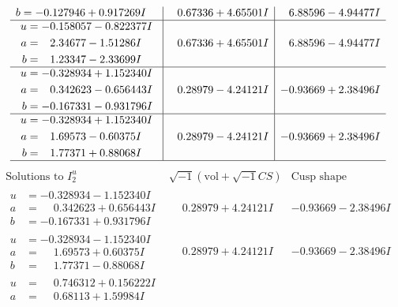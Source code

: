 \documentclass[1p]{elsarticle_modified}
\theoremstyle{definition}
\newcommand{\I}{\sqrt{-1}}
\begin{document}
$$\begin{array}{c|c|c}
\begin{aligned}
b &= -0.127946 + 0.917269 I\end{aligned}
 & \phantom{-}0.67336 + 4.65501 I & \phantom{-}6.88596 - 4.94477 I \\ \hline\begin{aligned}
u &= -0.158057 - 0.822377 I \\
a &= \phantom{-}2.34677 - 1.51286 I \\
b &= \phantom{-}1.23347 - 2.33699 I\end{aligned}
 & \phantom{-}0.67336 + 4.65501 I & \phantom{-}6.88596 - 4.94477 I \\ \hline\begin{aligned}
u &= -0.328934 + 1.152340 I \\
a &= \phantom{-}0.342623 - 0.656443 I \\
b &= -0.167331 - 0.931796 I\end{aligned}
 & \phantom{-}0.28979 - 4.24121 I & -0.93669 + 2.38496 I \\ \hline\begin{aligned}
u &= -0.328934 + 1.152340 I \\
a &= \phantom{-}1.69573 - 0.60375 I \\
b &= \phantom{-}1.77371 + 0.88068 I\end{aligned}
 & \phantom{-}0.28979 - 4.24121 I & -0.93669 + 2.38496 I\\
 \hline 
 \end{array}$$\newpage$$\begin{array}{c|c|c}  
\text{Solutions to }I^u_{2}& \I (\text{vol} + \sqrt{-1}CS) & \text{Cusp shape}\\
 \hline 
\begin{aligned}
u &= -0.328934 - 1.152340 I \\
a &= \phantom{-}0.342623 + 0.656443 I \\
b &= -0.167331 + 0.931796 I\end{aligned}
 & \phantom{-}0.28979 + 4.24121 I & -0.93669 - 2.38496 I \\ \hline\begin{aligned}
u &= -0.328934 - 1.152340 I \\
a &= \phantom{-}1.69573 + 0.60375 I \\
b &= \phantom{-}1.77371 - 0.88068 I\end{aligned}
 & \phantom{-}0.28979 + 4.24121 I & -0.93669 - 2.38496 I \\ \hline\begin{aligned}
u &= \phantom{-}0.746312 + 0.156222 I \\
a &= \phantom{-}0.68113 + 1.59984 I \\

\end{aligned}
\end{array}$$
\end{document}
